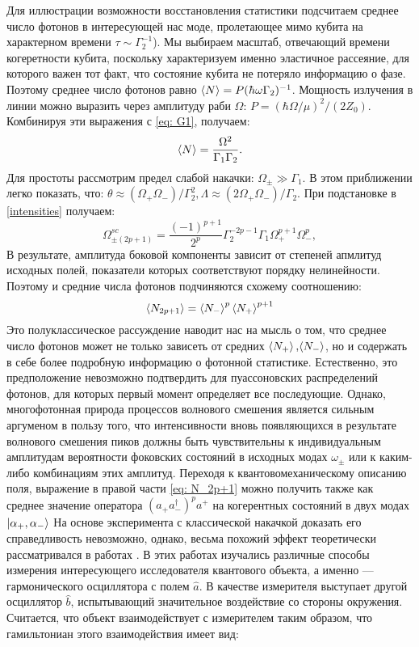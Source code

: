 Для иллюстрации возможности восстановления статистики подсчитаем среднее число фотонов в интересующей нас моде, пролетающее мимо кубита на характерном времени $\tau\sim\Gamma_2^{-1}$). Мы выбираем масштаб, отвечающий времени когеретности кубита, поскольку характеризуем именно эластичное рассеяние, для которого важен тот факт, что состояние кубита не потеряло информацию о фазе. Поэтому среднее число фотонов равно $\braket{N} = P(\hbar\omega\Gamma_2)^{-1}$. Мощность излучения в линии можно выразить через амплитуду раби $\Omega$: $P = (\hbar\Omega/\mu)^2/(2Z_0)$. Комбинируя эти выражения с \eqref{eq: G1}, получаем:
\begin{equation} \label{eq: av_photons}
	\braket{N} = \frac{\Omega^2}{\Gamma_1\Gamma_2}.
\end{equation}
Для простоты рассмотрим предел слабой накачки: $\Omega_{\pm} \gg \Gamma_1.$ В этом приближении легко показать, что:
$\theta \approx (\Omega_+\Omega_-)/\Gamma_2^2, \Lambda \approx (2\Omega_+\Omega_-)/{\Gamma_2}
$. При подстановке в \eqref{intensities} получаем:
\begin{equation}\label{eq: 2p+1_approx}
	\Omega_{\pm(2p+1)}^{sc} =\frac{(-1)^{p+1}}{2^{p}}\Gamma_2^{-2p-1}\Gamma_1\Omega_+^{p+1}\Omega_-^p,
\end{equation}
В результате, амплитуда боковой компоненты зависит от степеней апмлитуд исходных полей, показатели которых соответствуют порядку нелинейности. Поэтому и средние числа фотонов подчиняются схожему соотношению:
\begin{equation}\label{eq: N_2p+1}
	\braket{N_{2p+1}} = \braket{N_-}^p\braket{N_+}^{p+1}
\end{equation}
Это полуклассическое рассуждение наводит нас на мысль о том, что среднее число фотонов может не только зависеть от средних $\braket{N_+},\!\braket{N_-}$, но и содержать в себе более подробную информацию о фотонной статистике. Естественно, это предположение невозможно подтвердить для пуассоновских распределений фотонов, для которых первый момент определяет все последующие. Однако, многофотонная природа процессов волнового смешения является сильным аргуменом в пользу того, что интенсивности вновь появляющихся в результате волнового смешения пиков должны быть чувствительны к индивидуальным амплитудам вероятности фоковских состояний в исходных модах $\omega_\pm$ или к каким-либо комбинациям этих амплитуд. Переходя к квантовомеханическому описанию поля, выражение в правой части \eqref{eq: N_2p+1} можно получить также как среднее значение оператора $(a_+a_-^\dag)^pa^+$ на когерентных состояний в двух модах $\ket{\alpha_+, \alpha_-}$ На основе эксперимента с классической накачкой доказать его справедливость невозможно, однако, весьма похожий эффект теоретически рассматривался в работах \cite{WallsMilburn_PRD,PhysRevA.28.2646}. В этих работах изучались различные способы измерения интересующего исследователя квантового объекта, а именно --- гармонического осциллятора с полем $\hat{a}$. В качестве измерителя выступает другой осциллятор $\hat{b}$, испытывающий значительное воздействие со стороны окружения. Считается, что объект взаимодействует с измерителем таким образом, что гамильтониан этого взаимодействия имеет вид:
